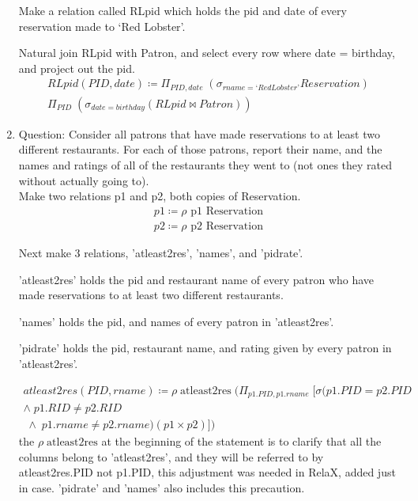 \documentclass{article}
\begin{document}
\begin{enumerate}
Make a relation called RLpid which holds the pid and date of every reservation made to ‘Red Lobster’.

Natural join RLpid with Patron, and select every row where date = birthday, and project out the pid.
		\begin{align}
         RLpid(PID,date) \coloneqq \Pi_{PID, date} \; (\sigma_{rname = ‘Red Lobster’} Reservation)\\
        \Pi_{PID} \; (\sigma_{date = birthday} (RLpid \bowtie Patron))
		\end{align} 


\item%
Question: Consider all patrons that have made reservations to at least two different restaurants. For each of
those patrons, report their name, and the names and ratings of all of the restaurants they went to (not
ones they rated without actually going to).\\

Make two relations p1 and p2, both copies of Reservation.
		\begin{align}
        p1 \coloneqq \rho \text{  p1 Reservation}  \\
        p2 \coloneqq\rho \text{  p2 Reservation}
		\end{align}

Next make 3 relations, 'atleast2res', 'names', and 'pidrate'.

'atleast2res' holds the pid and restaurant name of every patron who have made reservations to at least two different restaurants.

'names' holds the pid, and names of every patron in 'atleast2res'.

'pidrate' holds the pid, restaurant name, and rating given by every patron in 'atleast2res'.

		\begin{align}
         atleast2res(PID,rname)\coloneqq \rho \; \text{atleast2res} \;(\Pi_{p1.PID, p1.rname} \; [\sigma (p1.PID = p2.PID \\ \wedge \; p1.RID \neq p2.RID \\ \; \wedge \; p1.rname \neq p2.rname) (p1 \times p2) ])         
		\end{align}
		the $\rho \; \text{atleast2res}$ at the beginning of the statement is to clarify that all the columns belong to 'atleast2res', and they will be referred to by atleast2res.PID not p1.PID, this adjustment was needed in RelaX, added just in case.
'pidrate' and 'names' also includes this precaution.


\end{enumerate}
\end{document}
